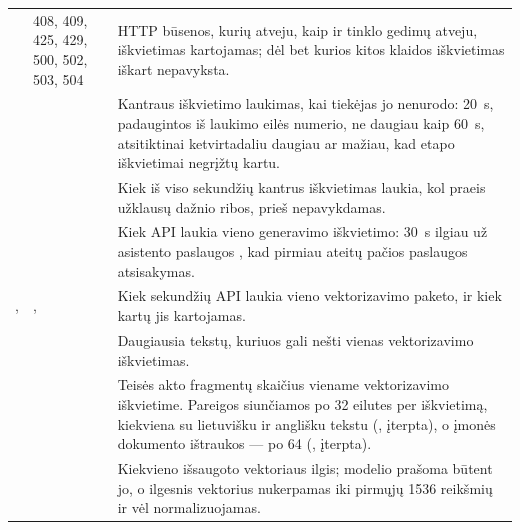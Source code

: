 \begin{xltabular}{\textwidth}{@{}L{44mm}L{19mm}Y@{}}
 & 408, 409, 425, 429, 500, 502, 503, 504 & HTTP būsenos, kurių atveju, kaip ir tinklo gedimų atveju, iškvietimas kartojamas; dėl bet kurios kitos klaidos iškvietimas iškart nepavyksta. \\
 &  & Kantraus iškvietimo laukimas, kai tiekėjas jo nenurodo: 20~s, padaugintos iš laukimo eilės numerio, ne daugiau kaip 60~s, atsitiktinai ketvirtadaliu daugiau ar mažiau, kad etapo iškvietimai negrįžtų kartu. \\
 &  & Kiek iš viso sekundžių kantrus iškvietimas laukia, kol praeis užklausų dažnio ribos, prieš nepavykdamas. \\
 &  & Kiek API laukia vieno generavimo iškvietimo: 30~s ilgiau už asistento paslaugos , kad pirmiau ateitų pačios paslaugos atsisakymas. \\
,  & ,  & Kiek sekundžių API laukia vieno vektorizavimo paketo, ir kiek kartų jis kartojamas. \\
 &  & Daugiausia tekstų, kuriuos gali nešti vienas vektorizavimo iškvietimas. \\
 &  & Teisės akto fragmentų skaičius viename vektorizavimo iškvietime. Pareigos siunčiamos po 32 eilutes per iškvietimą, kiekviena su lietuvišku ir anglišku tekstu (, įterpta), o įmonės dokumento ištraukos --- po 64 (, įterpta). \\
 &  & Kiekvieno išsaugoto vektoriaus ilgis;  modelio prašoma būtent jo, o ilgesnis vektorius nukerpamas iki pirmųjų 1536 reikšmių ir vėl normalizuojamas. \\

\end{xltabular}
